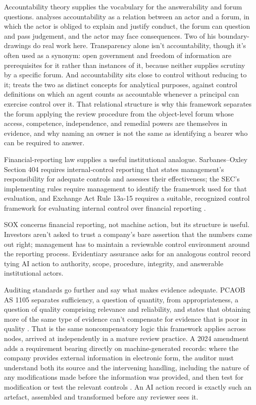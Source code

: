 Accountability theory supplies the vocabulary for the answerability and forum questions. \textcite{bovens2007accountability} analyses accountability as a relation between an actor and a forum, in which the actor is obliged to explain and justify conduct, the forum can question and pass judgement, and the actor may face consequences. Two of his boundary-drawings do real work here. Transparency alone isn't accountability, though it's often used as a synonym: open government and freedom of information are prerequisites for it rather than instances of it, because neither supplies scrutiny by a specific forum. And accountability sits close to control without reducing to it; \textcite{bovens2007accountability} treats the two as distinct concepts for analytical purposes, against control definitions on which an agent counts as accountable whenever a principal can exercise control over it. That relational structure is why this framework separates the forum applying the review procedure from the object-level forum whose access, competence, independence, and remedial powers are themselves in evidence, and why naming an owner is not the same as identifying a bearer who can be required to answer.

Financial-reporting law supplies a useful institutional analogue. Sarbanes--Oxley Section 404 requires internal-control reporting that states management's responsibility for adequate controls and assesses their effectiveness; the SEC's implementing rules require management to identify the framework used for that evaluation, and Exchange Act Rule 13a-15 requires a suitable, recognized control framework for evaluating internal control over financial reporting \citep{sarbanesOxley404,sec2003managementReport,secExchangeRule13a15}.

SOX concerns financial reporting, not machine action, but its structure is useful. Investors aren't asked to trust a company's bare assertion that the numbers came out right; management has to maintain a reviewable control environment around the reporting process. Evidentiary assurance asks for an analogous control record tying AI action to authority, scope, procedure, integrity, and answerable institutional actors.

Auditing standards go further and say what makes evidence adequate. PCAOB AS 1105 separates sufficiency, a question of quantity, from appropriateness, a question of quality comprising relevance and reliability, and states that obtaining more of the same type of evidence can't compensate for evidence that is poor in quality \citep{pcaob2024auditEvidence}. That is the same noncompensatory logic this framework applies across nodes, arrived at independently in a mature review practice. A 2024 amendment adds a requirement bearing directly on machine-generated records: where the company provides external information in electronic form, the auditor must understand both its source and the intervening handling, including the nature of any modifications made before the information was provided, and then test for modification or test the relevant controls \citep{pcaob2024auditEvidence}. An AI action record is exactly such an artefact, assembled and transformed before any reviewer sees it.

